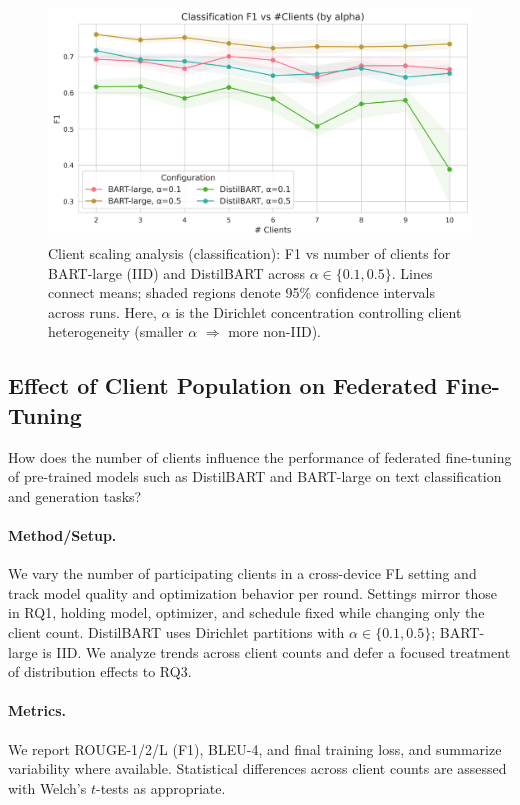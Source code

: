\documentclass[conference]{IEEEtran}
\begin{document}
\begin{figure}[t]
    \centering
    \includegraphics[width=\columnwidth]{../plots/classification/cls_f1_vs_clients_combined.png}
    \caption{Client scaling analysis (classification): F1 vs number of clients for BART-large (IID) and DistilBART across $\alpha\in\{0.1, 0.5\}$. Lines connect means; shaded regions denote 95\% confidence intervals across runs. Here, $\alpha$ is the Dirichlet concentration controlling client heterogeneity (smaller $\alpha$ $\Rightarrow$ more non-IID).}
    \label{fig:client_scaling}
\end{figure}

\subsection{Effect of Client Population on Federated Fine-Tuning}\label{sec:rq2}
How does the number of clients influence the performance of federated fine-tuning of pre-trained models such as DistilBART and BART-large on text classification and generation tasks?

\paragraph{Method/Setup.} We vary the number of participating clients in a cross-device FL setting and track model quality and optimization behavior per round. Settings mirror those in RQ1, holding model, optimizer, and schedule fixed while changing only the client count. DistilBART uses Dirichlet partitions with $\alpha\in\{0.1, 0.5\}$; BART-large is IID. We analyze trends across client counts and defer a focused treatment of distribution effects to RQ3.

\paragraph{Metrics.} We report ROUGE-1/2/L (F1), BLEU-4, and final training loss, and summarize variability where available. Statistical differences across client counts are assessed with Welch's $t$-tests as appropriate.
\end{document}
